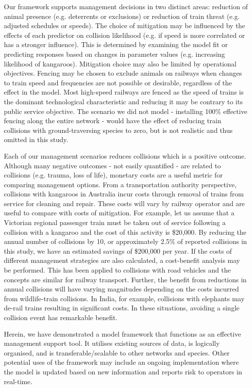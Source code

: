 Our framework supports management decisions in two distinct areas: reduction of animal presence (e.g. deterrents or exclusions) or reduction of train threat (e.g. adjusted schedules or speeds).  The choice of mitigation may be influenced by the effects of each predictor on collision likelihood (e.g. if speed is more correlated or has a stronger influence).  This is determined by examining the model fit or predicting responses based on changes in parameter values (e.g. increasing likelihood of kangaroos).  Mitigation choice may also be limited by operational objectives.  Fencing may be chosen to exclude animals on railways when changes to train speed and frequencies are not possible or desirable, regardless of the effect in the model. Most high-speed railways are fenced \citep{camp09} as the speed of trains is the dominant technological characteristic and reducing it may be contrary to its public service objective. The scenario we did not model - installing 100\% effective fencing along the entire network - would have the effect of reducing train collisions with ground-traversing species to zero, but is not realistic and thus omitted in this study.

Each of our management scenarios reduces collisions which is a positive outcome.  Although many negative outcomes - not easily quantified - are related to collisions (e.g. trauma, loss of life), monetary costs are a useful metric for comparing management options. From a transportation authority perspective, collisions with kangaroos in Australia incur costs through removal of trains from service for cleaning and repair.  These costs will vary by railway operator and are useful to compare with costs of mitigation.  For example, let us assume that a Victorian regional passenger train must be taken out of service following a collision with a kangaroo and the cost of this activity is \$20,000.  By reducing the annual number of collisions by 10, or approximately 2.5\% of reported collisions in this study, we have an estimated savings of \$200,000 per year.  If the costs of different management strategies are also calculated, a cost-benefit analysis may be performed.  This has been applied to collisions with road vehicles \citep{huij09} and the concepts are similar for railway transport. Further, the benefit from reductions in annual collisions will have varying magnitudes depending on the costs incurred from wildlife-train collisions. In India, for example, collisions with elephants may de-rail trains \citep{dors15} resulting in significant costs. In these situations, avoiding a single collision event has remarkable benefit.

Herein, we have demonstrated a model framework that functions as an effective management support tool. It utilises existing sources of data, is logically organised, and is transferable/scalable to other networks and species. Other potential uses of the framework may include an ongoing implementation where the model is updated based on new information and reports risk to operators in real-time.